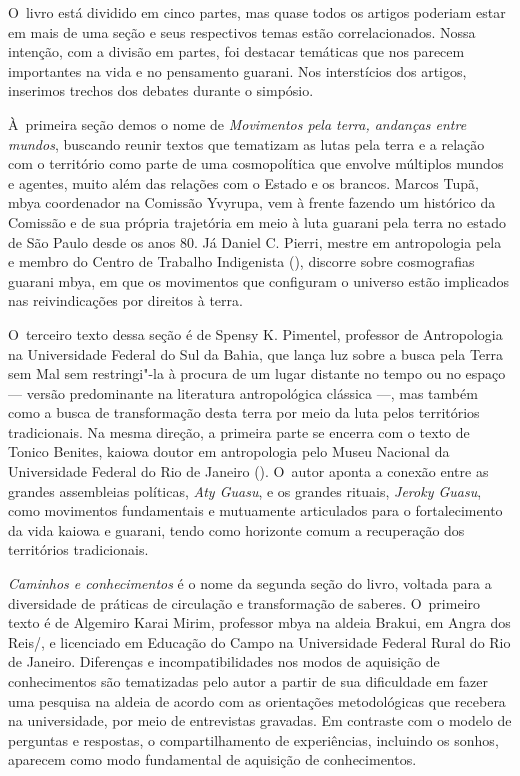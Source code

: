 O~livro está dividido em cinco partes, mas quase todos os artigos
poderiam estar em mais de uma seção e seus respectivos temas estão
correlacionados. Nossa intenção, com a divisão em partes, foi destacar
temáticas que nos parecem importantes na vida e no pensamento guarani.
Nos interstícios dos artigos, inserimos trechos dos debates durante o
simpósio.

À~primeira seção demos o nome de \emph{Movimentos pela terra, andanças entre
mundos}, buscando reunir textos que tematizam as lutas pela terra e a
relação com o território como parte de uma cosmopolítica que envolve
múltiplos mundos e agentes, muito além das relações com o Estado e os
brancos. Marcos Tupã, mbya coordenador na Comissão Yvyrupa, vem à
frente fazendo um histórico da Comissão e de sua própria trajetória em
meio à luta guarani pela terra no estado de São Paulo desde os anos 80.
Já Daniel C. Pierri, mestre em antropologia pela  e membro do Centro
de Trabalho Indigenista (), discorre sobre cosmografias guarani
mbya, em que os movimentos que configuram o universo estão implicados
nas reivindicações por direitos à terra.

O~terceiro texto dessa seção é de Spensy K. Pimentel, professor de
Antropologia na Universidade Federal do Sul da Bahia, que lança luz
sobre a busca pela Terra sem Mal sem restringi"-la à procura de um lugar
distante no tempo ou no espaço --- versão predominante na literatura
antropológica clássica ---, mas também como a busca de transformação
desta terra por meio da luta pelos territórios tradicionais. Na mesma
direção, a primeira parte se encerra com o texto de Tonico Benites,
kaiowa doutor em antropologia pelo Museu Nacional da Universidade
Federal do Rio de Janeiro (). O~autor aponta a conexão entre as
grandes assembleias políticas, \emph{Aty Guasu}, e os grandes rituais, \emph{Jeroky
Guasu}, como movimentos fundamentais e mutuamente articulados para o
fortalecimento da vida kaiowa e guarani, tendo como horizonte comum a
recuperação dos territórios tradicionais.

\emph{Caminhos e conhecimentos} é o nome da segunda seção do livro, voltada
para a diversidade de práticas de circulação e transformação de
saberes. O~primeiro texto é de Algemiro Karai Mirim, professor mbya na
aldeia Brakui, em Angra dos Reis/, e licenciado em
Educação do Campo na Universidade Federal Rural do Rio de Janeiro.
Diferenças e incompatibilidades nos modos de aquisição de conhecimentos
são tematizadas pelo autor a partir de sua dificuldade em fazer uma
pesquisa na aldeia de acordo com as orientações metodológicas que
recebera na universidade, por meio de entrevistas gravadas. Em
contraste com o modelo de perguntas e respostas, o compartilhamento de
experiências, incluindo os sonhos, aparecem como modo fundamental de
aquisição de conhecimentos. 

